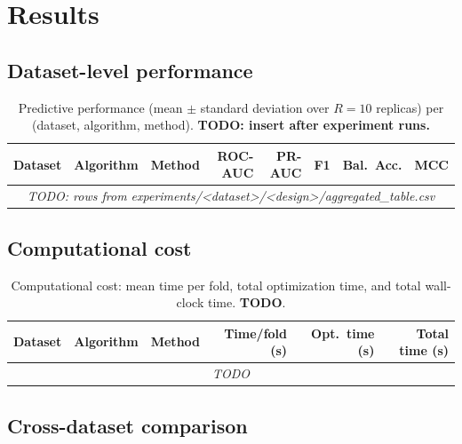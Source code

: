 \section{Results}\label{sec:results}


\subsection{Dataset-level performance}
\label{sec:res-performance}
\begin{table}[t]
  \centering
  \caption{Predictive performance (mean $\pm$ standard deviation over
  $R{=}10$ replicas) per (dataset, algorithm, method).
  \textbf{TODO: insert after experiment runs.}}
  \label{tab:performance}
  \begin{tabular}{lllrrrrr}
    \toprule
    Dataset & Algorithm & Method & ROC-AUC & PR-AUC & F1 & Bal.\ Acc. & MCC \\
    \midrule
    \multicolumn{8}{c}{\textit{TODO: rows from
       experiments/<dataset>/<design>/aggregated\_table.csv}} \\
    \bottomrule
  \end{tabular}
\end{table}

\subsection{Computational cost}
\label{sec:res-cost}
\begin{table}[t]
  \centering
  \caption{Computational cost: mean time per fold, total optimization
  time, and total wall-clock time. \textbf{TODO}.}
  \label{tab:cost}
  \begin{tabular}{lllrrr}
    \toprule
    Dataset & Algorithm & Method & Time/fold (s) & Opt.\ time (s) & Total time (s) \\
    \midrule
    \multicolumn{6}{c}{\textit{TODO}} \\
    \bottomrule
  \end{tabular}
\end{table}

\subsection{Cross-dataset comparison}
\label{sec:res-friedman}

